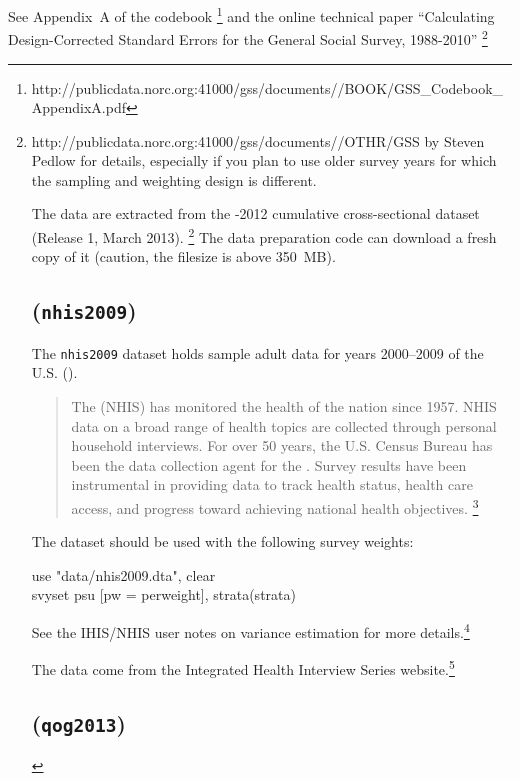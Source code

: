 See Appendix~A of the \GSS codebook%
   \footnote{http://publicdata.norc.org:41000/gss/documents//BOOK/GSS_Codebook_AppendixA.pdf} %
   and the online technical paper ``Calculating Design-Corrected Standard Errors for the General Social Survey, 1988-2010''%
   \footnote{http://publicdata.norc.org:41000/gss/documents//OTHR/GSS%
   by Steven Pedlow for details, especially if you plan to use older survey years for which the sampling and weighting design is different.%

The data are extracted from the -2012 cumulative cross-sectional dataset (Release 1, March 2013).%
  \footnote{\url{http://www3.norc.org/GSS+Website/Download/STATA+v8.0+Format/}} %
  The data preparation code can download a fresh copy of it (caution, the filesize is above 350~MB).%

\section*{\nhis (\texttt{nhis2009})}

The \texttt{nhis2009} dataset holds sample adult data for years 2000--2009 of the U.S. \nhis (\NHIS).

\begin{quote}
	The \nhis (NHIS) has monitored the health of the nation since 1957. NHIS data on a broad range of health topics are collected through personal household interviews. For over 50 years, the U.S. Census Bureau has been the data collection agent for the \NHIS. Survey results have been instrumental in providing data to track health status, health care access, and progress toward achieving national health objectives.%
	\footnote{\url{http://www.cdc.gov/nchs/nhis.htm}} 
\end{quote}

The \NHIS dataset should be used with the following survey weights:

\begin{docspec}
    use "data/nhis2009.dta", clear\\
    svyset psu [pw = perweight], strata(strata)
\end{docspec}

See the IHIS/NHIS user notes on variance estimation for more details.\footnote{\url{http://www.ihis.us/ihis/userNotes_variance.shtml}}

The data come from the Integrated Health Interview Series website.\footnote{\url{http://www.ihis.us/}}

\section*{\qog (\texttt{qog2013})}

}

